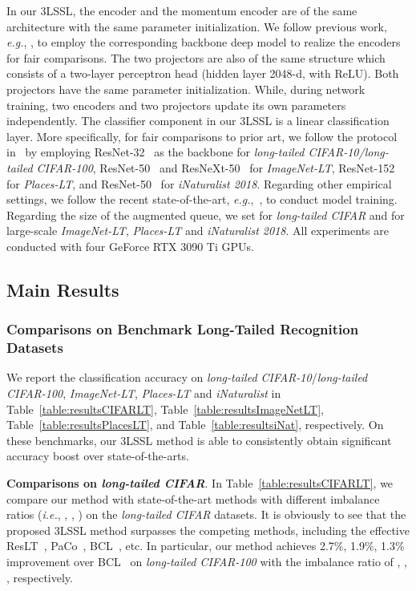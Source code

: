 \documentclass[10pt,journal,compsoc]{IEEEtran}
\newcommand{\eg}{\emph{e.g.}}
\newcommand{\ie}{\emph{i.e.}}
\begin{document}
In our 3LSSL, the encoder and the momentum encoder are of the same architecture with the same parameter initialization. We follow previous work, \eg, \cite{bbn,xu2021towards,calibrationcvpr2021,GCLcvpr22,SADEnips22,ResLTPAMI,Cui_2021_ICCV,BCLcvpr22}, to employ the corresponding backbone deep model to realize the encoders for fair comparisons. The two projectors are also of the same structure which consists of a two-layer perceptron head (hidden layer 2048-d, with ReLU). Both projectors have the same parameter initialization. While, during network training, two encoders and two projectors update its own parameters independently. The classifier component in our 3LSSL is a linear classification layer. More specifically, for fair comparisons to prior art, we follow the protocol in~\cite{bbn,xu2021towards,calibrationcvpr2021,GCLcvpr22,SADEnips22,ResLTPAMI,Cui_2021_ICCV,BCLcvpr22} by employing ResNet-32~\cite{he2016deep} as the backbone for \emph{long-tailed CIFAR-10/long-tailed CIFAR-100}, ResNet-50~\cite{he2016deep} and ResNeXt-50~\cite{xie2017aggregated} for \emph{ImageNet-LT}, ResNet-152~\cite{he2016deep} for \emph{Places-LT}, and ResNet-50~\cite{he2016deep} for \emph{iNaturalist 2018}. Regarding other empirical settings, we follow the recent state-of-the-art, \eg,~\cite{BCLcvpr22,Cui_2021_ICCV}, to conduct model training. Regarding the size  of the augmented queue, we set  for \emph{long-tailed CIFAR} and  for large-scale \emph{ImageNet-LT}, \emph{Places-LT} and \emph{iNaturalist 2018}. All experiments are conducted with four GeForce RTX 3090 Ti GPUs.

\subsection{Main Results}

\subsubsection{Comparisons on Benchmark Long-Tailed Recognition Datasets}

We report the classification accuracy on \emph{long-tailed CIFAR-10}/\emph{long-tailed CIFAR-100}, \emph{ImageNet-LT}, \emph{Places-LT} and \emph{iNaturalist} in Table~\ref{table:resultsCIFARLT}, Table~\ref{table:resultsImageNetLT}, Table~\ref{table:resultsPlacesLT}, and Table~\ref{table:resultsiNat}, respectively. On these benchmarks, our 3LSSL method is able to consistently obtain significant accuracy boost over state-of-the-arts.

\textbf{Comparisons on \emph{long-tailed CIFAR}}. In Table~\ref{table:resultsCIFARLT}, we compare our method with state-of-the-art methods with different imbalance ratios (\ie, , , ) on the \emph{long-tailed CIFAR} datasets. It is obviously to see that the proposed 3LSSL method surpasses the competing methods, including the effective ResLT~\cite{ResLTPAMI}, PaCo~\cite{Cui_2021_ICCV}, BCL~\cite{BCLcvpr22}, etc. In particular, our method achieves 2.7\%, 1.9\%, 1.3\% improvement over BCL~\cite{BCLcvpr22} on \emph{long-tailed CIFAR-100} with the imbalance ratio of , , , respectively.
\end{document}
